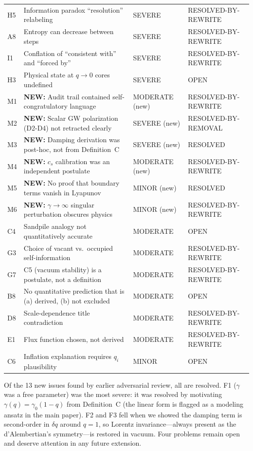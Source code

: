 \documentclass[reprint]{revtex4-2}
\begin{document}
\begin{table}[h]
\begin{tabular}{p{0.5cm}p{5.5cm}ll}
H5 & Information paradox ``resolution'' relabeling & SEVERE & RESOLVED-BY-REWRITE \\
A8 & Entropy can decrease between steps & SEVERE & RESOLVED-BY-REWRITE \\
I1 & Conflation of ``consistent with'' and ``forced by'' & SEVERE & RESOLVED-BY-REWRITE \\
H3 & Physical state at $q\to 0$ cores undefined & SEVERE & OPEN \\
M1 & \textbf{NEW:} Audit trail contained self-congratulatory language & MODERATE (new) & RESOLVED-BY-REWRITE \\
M2 & \textbf{NEW:} Scalar GW polarization (D2-D4) not retracted clearly & SEVERE (new) & RESOLVED-BY-REMOVAL \\
M3 & \textbf{NEW:} Damping derivation was post-hoc, not from Definition~C & SEVERE (new) & RESOLVED \\
M4 & \textbf{NEW:} $c_s$ calibration was an independent postulate & MODERATE (new) & RESOLVED-BY-REWRITE \\
M5 & \textbf{NEW:} No proof that boundary terms vanish in Lyapunov & MINOR (new) & RESOLVED \\
M6 & \textbf{NEW:} $\gamma\to\infty$ singular perturbation obscures physics & MINOR (new) & RESOLVED-BY-REWRITE \\
C4 & Sandpile analogy not quantitatively accurate & MODERATE & OPEN \\
G3 & Choice of vacant vs.\ occupied self-information & MODERATE & RESOLVED-BY-REWRITE \\
G7 & C5 (vacuum stability) is a postulate, not a definition & MODERATE & RESOLVED-BY-REWRITE \\
B8 & No quantitative prediction that is (a) derived, (b) not excluded & MODERATE & OPEN \\
D8 & Scale-dependence title contradiction & MODERATE & RESOLVED-BY-REWRITE \\
E1 & Flux function chosen, not derived & MODERATE & RESOLVED-BY-REWRITE \\
C6 & Inflation explanation requires $q_i$ plausibility & MINOR & OPEN \\
\bottomrule
\end{tabular}
\end{table}

Of the 13 new issues found by earlier adversarial review, all are resolved. F1 ($\gamma$ was a free parameter) was the most severe: it was resolved by motivating $\gamma(q)=\gamma_0(1-q)$ from Definition~C (the linear form is flagged as a modeling ansatz in the main paper). F2 and F3 fell when we showed the damping term is second-order in $\delta q$ around $q=1$, so Lorentz invariance---always present as the d'Alembertian's symmetry---is restored in vacuum. Four problems remain open and deserve attention in any future extension.
\end{document}
